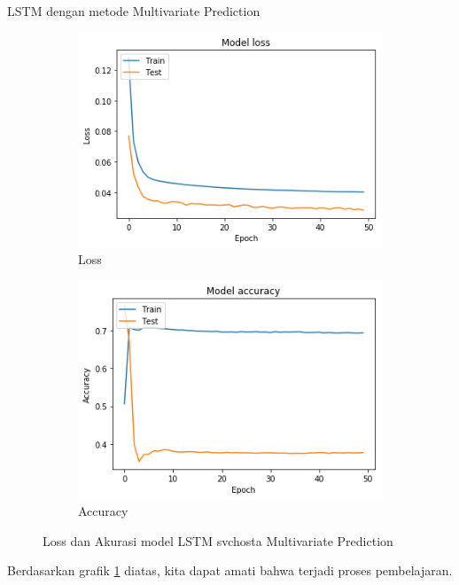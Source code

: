\documentclass[t]{beamer}
\begin{document}
\begin{frame}{LSTM dengan metode Multivariate Prediction}
	\begin{figure}[H]
		\centering
		\begin{subfigure}[b]{.45\linewidth}
		    \includegraphics[width=\textwidth]{public/assets/img/lstmm_svchosta_loss.png}
		    \caption{Loss}
		\end{subfigure}
		\begin{subfigure}[b]{.45\linewidth}
		    \includegraphics[width=\textwidth]{public/assets/img/lstmm_svchosta_acc.png}
		    \caption{Accuracy}
		\end{subfigure}
		\caption{Loss dan Akurasi model LSTM svchosta Multivariate Prediction}
		\label{fig:lstmm_svchosta}
	\end{figure}
	\per Berdasarkan grafik \ref{fig:lstmm_svchosta} diatas, kita dapat amati bahwa terjadi proses pembelajaran.
\end{frame}
\end{document}
